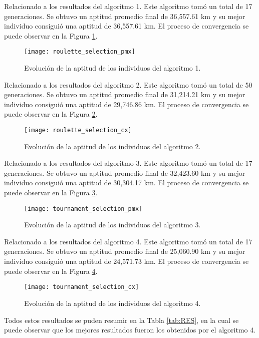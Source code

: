 Relacionado a los resultados del algoritmo 1. Este algoritmo tomó un total de 17 generaciones. Se obtuvo un aptitud promedio final de 36,557.61 km y su mejor individuo consiguió una aptitud de 36,557.61 km. El proceso de convergencia se puede observar en la Figura \ref{fig:AG_1}.

\begin{figure}[htbp]
	\centering
	\texttt{[image: roulette\_selection\_pmx]}
	\caption{Evolución de la aptitud de los individuos del algoritmo 1.}
	\label{fig:AG_1}
\end{figure}

Relacionado a los resultados del algoritmo 2. Este algoritmo tomó un total de 50 generaciones. Se obtuvo un aptitud promedio final de 31,214.21 km y su mejor individuo consiguió una aptitud de 29,746.86 km. El proceso de convergencia se puede observar en la Figura \ref{fig:AG_2}.

\begin{figure}[htbp]
	\centering
	\texttt{[image: roulette\_selection\_cx]}
	\caption{Evolución de la aptitud de los individuos del algoritmo 2.}
	\label{fig:AG_2}
\end{figure}

\newpage
Relacionado a los resultados del algoritmo 3. Este algoritmo tomó un total de 17 generaciones. Se obtuvo un aptitud promedio final de 32,423.60 km y su mejor individuo consiguió una aptitud de 30,304.17 km. El proceso de convergencia se puede observar en la Figura \ref{fig:AG_3}.

\begin{figure}[htbp]
	\centering
	\texttt{[image: tournament\_selection\_pmx]}
	\caption{Evolución de la aptitud de los individuos del algoritmo 3.}
	\label{fig:AG_3}
\end{figure}

Relacionado a los resultados del algoritmo 4. Este algoritmo tomó un total de 17 generaciones. Se obtuvo un aptitud promedio final de 25,060.90 km y su mejor individuo consiguió una aptitud de 24,571.73 km. El proceso de convergencia se puede observar en la Figura \ref{fig:AG_4}.

\begin{figure}[htbp]
	\centering
	\texttt{[image: tournament\_selection\_cx]}
	\caption{Evolución de la aptitud de los individuos del algoritmo 4.}
	\label{fig:AG_4}
\end{figure}

Todos estos resultados se puden resumir en la Tabla \ref{tab:RES}, en la cual se puede observar que los mejores resultados fueron los obtenidos por el algoritmo 4.

